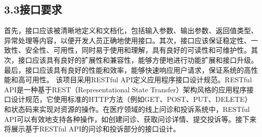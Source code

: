\documentclass[24pt,a4paper]{article}%
\begin{document}
\subsection*{\songti 3.3接口要求}
首先，接口应该被清晰地定义和文档化，包括输入参数、输出参数、返回值类型、异常处理等内容，以便开发人员正确地使用接口。其次，接口应该保证稳定性、一致性、安全性、可用性，同时易于使用和理解，具有良好的可读性和可维护性。其次，接口应该具有良好的扩展性和兼容性，能够方便地进行功能扩展和接口升级。最后，接口应该具有良好的性能和效率，能够快速响应用户请求，保证系统的高性能和高可用性。
该项目采用RESTful API定义应用程序接口设计规范。RESTful API是一种基于REST（Representational State Transfer）架构风格的应用程序接口设计规范，它使用标准的HTTP方法（例如GET、POST、PUT、DELETE）和状态码来实现对资源的操作。在医疗领域的线上问诊和投诉系统中，RESTful API可以有效地支持各种操作，如创建问诊、获取问诊详情、提交投诉等。接下来将展示基于RESTful API的问诊和投诉部分的接口设计。
\end{document}
